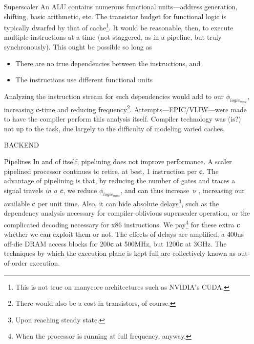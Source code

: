\documentclass[mathserif,xcolor={dvipsnames,table}]{beamer}
\begin{document}
\begin{frame}{Superscaler}
An ALU contains numerous functional units---address generation, shifting, basic
arithmetic, etc. The transistor budget for functional logic is typically
dwarfed by that of cache\footnote{\tiny{This is not true on manycore architectures
such as NVIDIA's CUDA.}}.
\vfill
It would be reasonable, then, to execute multiple instructions at a time (not
staggered, as in a pipeline, but truly synchronously). This ought be possible
so long as
\begin{itemize}
\item There are no true dependencies between the instructions, and
\item The instructions use different functional units
\end{itemize}
\vfill
Analyzing the instruction stream for such dependencies would add to our
$\phi_{logic_{max}}$, increasing \textbf{c}-time and reducing frequency\footnote{\tiny{There
would also be a cost in transistors, of course.}}.
\vfill
Attempts---EPIC/VLIW---were made to have the compiler perform this analysis
itself. Compiler technology was (is?) not up to the task, due largely to the
difficulty of modeling varied caches.
\end{frame}

\begin{frame}
\huge{BACKEND}
\end{frame}

\begin{frame}{Pipelines}
In and of itself, pipelining does not improve performance. A scaler pipelined
processor continues to retire, at best, 1 instruction per \textbf{c}.
\vfill
The advantage of pipelining is that, by reducing the number of gates and traces
a signal travels \textit{in a \textbf{c}}, we reduce $\phi_{logic_{max}}$, and
can thus increase $\upnu$, increasing our available \textbf{c} per
unit time. Also, it can hide absolute delays\footnote{\tiny{Upon reaching steady state.}},
such as the dependency analysis necessary for compiler-oblivious superscaler
operation, or the complicated decoding necessary for x86 instructions.
\vfill
We pay\footnote{\tiny{When the processor is running at full frequency, anyway.}} for
these extra \textbf{c} whether we can exploit them or not. The effects of
delays are amplified; a 400ns off-die DRAM access blocks for 200\textbf{c} at
500MHz, but 1200\textbf{c} at 3GHz.
\vfill
The techniques by which the execution plane is kept full are
collectively known as out-of-order execution.
\end{frame}
\end{document}
